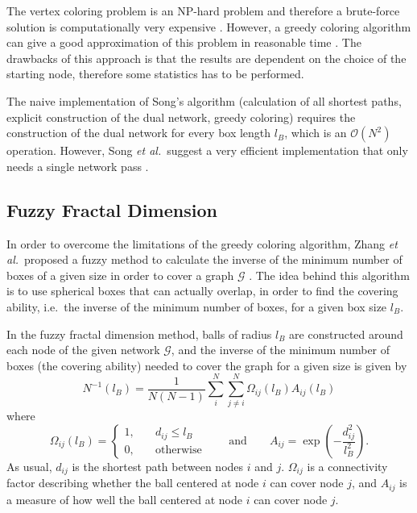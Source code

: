 \documentclass[9pt,onecolumn,twoside]{pnas-new}
\begin{document}
{The vertex coloring problem is an NP-hard problem and therefore a brute-force solution is computationally very expensive \cite{christofides1971}. However, a greedy coloring algorithm can give a good approximation of this problem in reasonable time \cite{song2007}. The drawbacks of this approach is that the results are dependent on the choice of the starting node, therefore some statistics has to be performed.

The naive implementation of Song's algorithm (calculation of all shortest paths, explicit construction of the dual network, greedy coloring) requires the construction of the dual network for every box length $l_B$, which is an $\mathcal{O}(N^2)$ operation. However, Song \emph{et al.}\ suggest a very efficient implementation that only needs a single network pass \cite{song2007}.

\subsection*{Fuzzy Fractal Dimension}
In order to overcome the limitations of the greedy coloring algorithm, Zhang \emph{et al.}\ proposed a fuzzy method to calculate the inverse of the minimum number of boxes of a given size in order to cover a graph $\mathcal{G}$ \cite{zhang2014}. The idea behind this algorithm is to use spherical boxes that can actually overlap, in order to find the covering ability, i.e.\ the inverse of the minimum number of boxes, for a given box size $l_B$.

In the fuzzy fractal dimension method, balls of radius $l_B$ are constructed around each node of the given network $\mathcal{G}$, and the inverse of the minimum number of boxes (the covering ability) needed to cover the graph for a given size is given by
\[
    N^{-1}(l_B) = \frac{1}{N(N-1)} \sum_{i}^N \sum_{j\neq i}^N \Omega_{ij}(l_B)A_{ij}(l_B)
\]
where
\[
    \Omega_{ij}(l_B) = \begin{cases} 1,& \quad d_{ij} \le l_B \\ 0,& \quad \text{otherwise} \end{cases} \qquad \mathrm{and} \qquad A_{ij} = \exp\left( -\frac{d_{ij}^2}{l_B^2} \right).
\]
As usual, $d_{ij}$ is the shortest path between nodes $i$ and $j$. $\Omega_{ij}$ is a connectivity factor describing whether the ball centered at node $i$ can cover node $j$, and $A_{ij}$ is a measure of how well the ball centered at node $i$ can cover node $j$.

}
\end{document}
